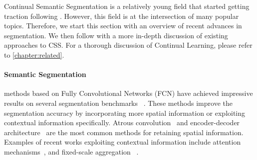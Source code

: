 Continual Semantic Segmentation is a relatively young field that started getting traction following
\cite{michieli2019ilt,cermelli2020modelingthebackground}. However, this field is at the intersection
of many popular topics. Therefore, we start this section with an overview of recent advances in
segmentation. We then follow with a more in-depth discussion of existing approaches to \ac{CSS}. For
a thorough discussion of Continual Learning, please refer to \autoref{chapter:related}.

\paragraph{Semantic Segmentation} methods based on Fully Convolutional Networks (FCN)
\citep{long2015fcn,sermanet2014overfeat} have achieved impressive results on several segmentation
benchmarks ~\citep{everingham2015pascalvoc,
    cordts2016cityscapes,zhou2017adedataset,caesar2018cocoostuff}. These methods improve the
segmentation accuracy by incorporating more spatial information or exploiting contextual information
specifically. Atrous convolution~\citep{chen2018deeplab,mehta2018espnet} and encoder-decoder
architecture~\citep{ronneberger2015UNet,noh2015deconvolution,badrinarayanan2017segnet} are the most
common methods for retaining spatial information. Examples of recent works exploiting contextual
information include attention
mechanisms~\citep{yuan2018ocnet,zhao2018psanet,fu2019DANet,huang2019CCNet,yuan2020ocr,tao2020HRNet,zhang2020resnest},
and fixed-scale aggregation
~\citep{zhao2017PSPNet,chen2018deeplab,chen2018ZPSA,zhang2018ContextEncoding}.

